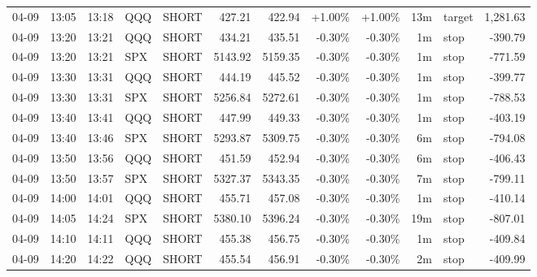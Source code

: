 \documentclass[11pt,a4paper,twoside]{article}
\begin{document}
\begin{center}
\begin{longtable}{>{\color{txtmain}}l l l l l r r r r r >{\color{txtmain}}l r}
04-09 & 13:05 & 13:18 & QQQ & SHORT & 427.21 & 422.94 & \textcolor{wingreen}{+1.00\%} & \textcolor{wingreen}{+1.00\%} & 13m & target & \textcolor{wingreen}{1,281.63} \\
04-09 & 13:20 & 13:21 & QQQ & SHORT & 434.21 & 435.51 & \textcolor{lossred}{-0.30\%} & \textcolor{lossred}{-0.30\%} & 1m & stop & \textcolor{lossred}{-390.79} \\
04-09 & 13:20 & 13:21 & SPX & SHORT & 5143.92 & 5159.35 & \textcolor{lossred}{-0.30\%} & \textcolor{lossred}{-0.30\%} & 1m & stop & \textcolor{lossred}{-771.59} \\
04-09 & 13:30 & 13:31 & QQQ & SHORT & 444.19 & 445.52 & \textcolor{lossred}{-0.30\%} & \textcolor{lossred}{-0.30\%} & 1m & stop & \textcolor{lossred}{-399.77} \\
04-09 & 13:30 & 13:31 & SPX & SHORT & 5256.84 & 5272.61 & \textcolor{lossred}{-0.30\%} & \textcolor{lossred}{-0.30\%} & 1m & stop & \textcolor{lossred}{-788.53} \\
04-09 & 13:40 & 13:41 & QQQ & SHORT & 447.99 & 449.33 & \textcolor{lossred}{-0.30\%} & \textcolor{lossred}{-0.30\%} & 1m & stop & \textcolor{lossred}{-403.19} \\
04-09 & 13:40 & 13:46 & SPX & SHORT & 5293.87 & 5309.75 & \textcolor{lossred}{-0.30\%} & \textcolor{lossred}{-0.30\%} & 6m & stop & \textcolor{lossred}{-794.08} \\
04-09 & 13:50 & 13:56 & QQQ & SHORT & 451.59 & 452.94 & \textcolor{lossred}{-0.30\%} & \textcolor{lossred}{-0.30\%} & 6m & stop & \textcolor{lossred}{-406.43} \\
04-09 & 13:50 & 13:57 & SPX & SHORT & 5327.37 & 5343.35 & \textcolor{lossred}{-0.30\%} & \textcolor{lossred}{-0.30\%} & 7m & stop & \textcolor{lossred}{-799.11} \\
04-09 & 14:00 & 14:01 & QQQ & SHORT & 455.71 & 457.08 & \textcolor{lossred}{-0.30\%} & \textcolor{lossred}{-0.30\%} & 1m & stop & \textcolor{lossred}{-410.14} \\
04-09 & 14:05 & 14:24 & SPX & SHORT & 5380.10 & 5396.24 & \textcolor{lossred}{-0.30\%} & \textcolor{lossred}{-0.30\%} & 19m & stop & \textcolor{lossred}{-807.01} \\
04-09 & 14:10 & 14:11 & QQQ & SHORT & 455.38 & 456.75 & \textcolor{lossred}{-0.30\%} & \textcolor{lossred}{-0.30\%} & 1m & stop & \textcolor{lossred}{-409.84} \\
04-09 & 14:20 & 14:22 & QQQ & SHORT & 455.54 & 456.91 & \textcolor{lossred}{-0.30\%} & \textcolor{lossred}{-0.30\%} & 2m & stop & \textcolor{lossred}{-409.99} \\

\end{longtable}
\end{center}
\end{document}
